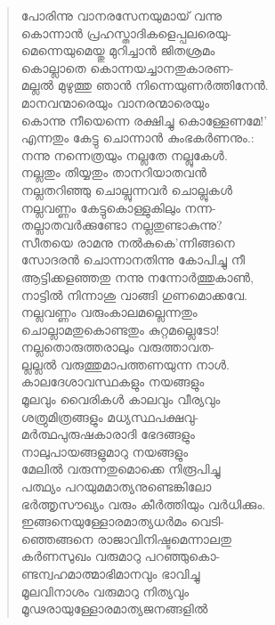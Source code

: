 \begin{verse}
പോരിന്നു വാനരസേനയുമായ് വന്നു\\
കൊന്നാന്‍ പ്രഹസ്താദികളെപ്പലരെയു-\\
മെന്നെയുമെയ്തു മുറിച്ചാന്‍ ജിതശ്രമം\\
കൊല്ലാതെ കൊന്നയച്ചാനതുകാരണ-\\
മല്ലല്‍ മുഴുത്തു ഞാന്‍ നിന്നെയുണര്‍ത്തിനേന്‍.\\
മാനവന്മാരെയും വാനരന്മാരെയും\\
കൊന്നു നീയെന്നെ രക്ഷിച്ചു കൊള്ളേണമേ!’\\
എന്നതും കേട്ടു ചൊന്നാന്‍ കുംഭകര്‍ണനും.:\\
നന്നു നന്നെത്രയും നല്ലതേ നല്ലുകേള്‍.\\
നല്ലതും തിയ്യതും താനറിയാതവന്‍\\
നല്ലതറിഞ്ഞു ചൊല്ലുന്നവര്‍ ചൊല്ലുകള്‍\\
നല്ലവണ്ണം കേട്ടുകൊള്ളുകിലും നന്ന-\\
തല്ലാതവര്‍ക്കുണ്ടോ നല്ലതുണ്ടാകുന്നു?\\
സീതയെ രാമനു നല്‍കുകെ’ന്നിങ്ങനെ\\
സോദരന്‍ ചൊന്നാനതിന്നു കോപിച്ചു നീ\\
ആട്ടിക്കളഞ്ഞതു നന്നു നന്നോര്‍ത്തുകാണ്‍,\\
നാട്ടില്‍ നിന്നാശു വാങ്ങി ഗുണമൊക്കവേ.\\
നല്ലവണ്ണം വരുംകാലമല്ലെന്നതും\\
ചൊല്ലാമതുകൊണ്ടതും കുറ്റമല്ലെടോ!\\
നല്ലതൊരുത്തരാലും വരുത്താവത-\\
ല്ലല്ലല്‍ വരുത്തുമാപത്തണയുന്ന നാള്‍.\\
കാലദേശാവസ്ഥകളും നയങ്ങളും\\
മൂലവും വൈരികള്‍ കാലവും വീര്യവും\\
ശത്രുമിത്രങ്ങളും മധ്യസ്ഥപക്ഷവു-\\
മര്‍ത്ഥപുരുഷകാരാദി ഭേദങ്ങളും\\
നാലുപായങ്ങളുമാറു നയങ്ങളും\\
മേലില്‍ വരുന്നതുമൊക്കെ നിരൂപിച്ചു\\
പത്ഥ്യം പറയുമമാത്യനുണ്ടെങ്കിലോ\\
ഭര്‍ത്തൃസൗഖ്യം വരും കീര്‍ത്തിയും വര്‍ധിക്കും.\\
ഇങ്ങനെയുള്ളോരമാത്യധര്‍മം വെടി-\\
ഞ്ഞെങ്ങനെ രാജാവിനിഷ്ടമെന്നാലതു\\
കര്‍ണസുഖം വരുമാറു പറഞ്ഞുകൊ-\\
ണ്ടന്വഹമാത്മാഭിമാനവും ഭാവിച്ചു\\
മൂലവിനാശം വരുമാറു നിത്യവും\\
മൂഢരായുള്ളോരമാത്യജനങ്ങളില്‍\\

\end{verse}
